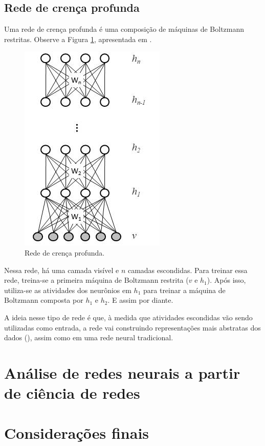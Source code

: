 \documentclass{article}
\begin{document}
        \subsection{Rede de crença profunda}

            Uma rede de crença profunda é uma composição de máquinas de Boltzmann restritas. Observe a Figura \ref{fig4}, apresentada em \cite{testolin2018deep}.

            \begin{figure}[h!]
                \centering
                \includegraphics[scale=0.5]{Images/Deep belief network.png}
                \caption{Rede de crença profunda.}
                \label{fig4}
            \end{figure}

            Nessa rede, há uma camada visível e $n$ camadas escondidas.
            Para treinar essa rede, treina-se a primeira máquina de Boltzmann restrita ($v$ e $h_1$).
            Após isso, utiliza-se as atividades dos neurônios em $h_1$ para treinar a máquina de Boltzmann composta por $h_1$ e $h_2$.
            E assim por diante.

            A ideia nesse tipo de rede é que, à medida que atividades escondidas vão sendo utilizadas como entrada, a rede vai construindo representações mais abstratas dos dados (\cite{testolin2018deep}), assim como em uma rede neural tradicional.

    \section{Análise de redes neurais a partir de ciência de redes}

    \section{Considerações finais}

    
    
\end{document}

